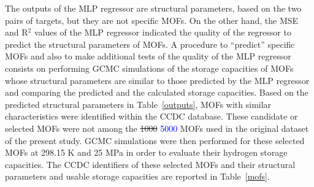 \documentclass[review]{elsarticle}
\begin{document}
The outputs of the MLP regressor are structural parameters, based on the two 
pairs of targets, but they are not specific MOFs. On the other hand, the MSE 
and R$^2$ values of the MLP regressor indicated the quality of the regressor to 
predict the structural parameters of MOFs. A procedure to ``predict'' specific 
MOFs and also to make additional tests of the quality of the MLP regressor 
consists on performing GCMC simulations of the storage capacities of MOFs whose 
structural parameters are similar to those predicted by the MLP regressor 
and comparing the predicted and the calculated storage capacities. Based 
on the predicted structural parameters in Table~\ref{outputs}, MOFs with 
similar characteristics were identified within the CCDC database. These 
candidate or selected MOFs were not among the \sout{1000} \textcolor{blue}{5000} 
MOFs used in the original dataset of 
the present study. GCMC simulations were then performed for these selected 
MOFs at 298.15 K and 25 MPa in order to evaluate their hydrogen storage 
capacities. The CCDC identifiers of these selected MOFs and their structural 
parameters and usable storage capacities are reported in Table~\ref{mofs}. 
\end{document}
